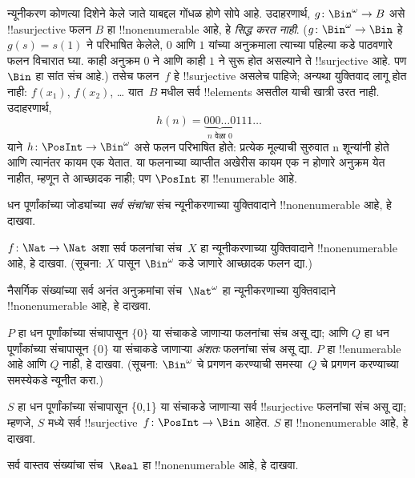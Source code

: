 \documentclass[../../../include/open-logic-section]{subfiles}
\begin{document}
\begin{explain}
न्यूनीकरण कोणत्या दिशेने केले जाते याबद्दल गोंधळ होणे सोपे आहे.
उदाहरणार्थ, $g \colon \Bin^\omega \to B$ असे !!a{surjective} फलन
$B$ हा !!{nonenumerable} आहे, हे \emph{सिद्ध करत नाही}. ($g
\colon \Bin^\omega \to \Bin$ हे $g(s) = s(1)$ ने परिभाषित केलेले,
$0$ आणि $1$ यांच्या अनुक्रमाला त्याच्या पहिल्या कडे
पाठवणारे फलन विचारात घ्या. काही अनुक्रम $0$ ने आणि काही $1$ ने सुरू
होत असल्याने ते !!{surjective} आहे. पण $\Bin$ हा सांत संच आहे.)
तसेच फलन~$f$ हे !!{surjective} असलेच पाहिजे; अन्यथा युक्तिवाद लागू
होत नाही: $f(x_1)$, $f(x_2)$, \dots{} यात~$B$ मधील सर्व !!{element}s
असतील याची खात्री उरत नाही. उदाहरणार्थ,
\[
h(n) = \underbrace{000\dots0}_{\text{$n$ वेळा $0$}}111\dots
\]
याने $h\colon \PosInt \to
\Bin^\omega$ असे फलन परिभाषित होते: प्रत्येक मूल्याची सुरुवात n शून्यांनी
होते आणि त्यानंतर कायम एक येतात. या फलनाच्या व्याप्तीत अखेरीस कायम एक
न होणारे अनुक्रम येत नाहीत, म्हणून ते आच्छादक नाही; पण $\PosInt$ हा
!!{enumerable} आहे.
\end{explain}

\begin{prob}
धन पूर्णांकांच्या जोड्यांच्या \emph{सर्व संचांचा} संच न्यूनीकरणाच्या
युक्तिवादाने !!{nonenumerable} आहे, हे दाखवा.
\end{prob}

\begin{prob}\label{sfr:siz:red:prob:nat-nat}
  $f\colon \Nat \to \Nat$ अशा सर्व फलनांचा संच~$X$ हा न्यूनीकरणाच्या
  युक्तिवादाने !!{nonenumerable} आहे, हे दाखवा. (सूचना: $X$ पासून
  $\Bin^\omega$ कडे जाणारे आच्छादक फलन द्या.)
\end{prob}

\begin{prob}
नैसर्गिक संख्यांच्या सर्व अनंत अनुक्रमांचा संच~$\Nat^\omega$ हा
न्यूनीकरणाच्या युक्तिवादाने !!{nonenumerable} आहे, हे दाखवा.
\end{prob}

\begin{prob}
$P$ हा धन पूर्णांकांच्या संचापासून $\{0\}$ या संचाकडे जाणाऱ्या फलनांचा
संच असू द्या; आणि $Q$ हा धन पूर्णांकांच्या संचापासून $\{0\}$ या
संचाकडे जाणाऱ्या \emph{अंशतः} फलनांचा संच असू द्या. $P$ हा
!!{enumerable} आहे आणि $Q$ नाही, हे दाखवा. (सूचना: $\Bin^\omega$ चे
प्रगणन करण्याची समस्या~$Q$ चे प्रगणन करण्याच्या समस्येकडे न्यूनीत करा.)
\end{prob}

\begin{prob}
$S$ हा धन पूर्णांकांच्या संचापासून \{0,1\} या संचाकडे जाणाऱ्या सर्व
!!{surjective} फलनांचा संच असू द्या; म्हणजे, $S$ मध्ये सर्व
!!{surjective}~$f\colon \PosInt \to \Bin$ आहेत. $S$ हा
!!{nonenumerable} आहे, हे दाखवा.
\end{prob}

\begin{prob}
सर्व वास्तव संख्यांचा संच~$\Real$ हा !!{nonenumerable} आहे, हे दाखवा.
\end{prob}
\end{document}

